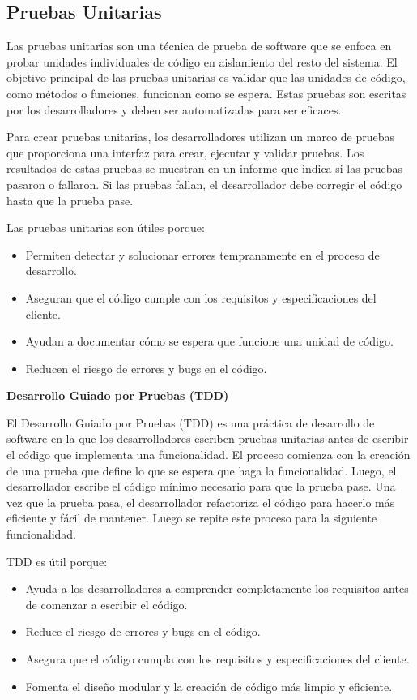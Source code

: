 \documentclass[executivepaper]{article}
\begin{document}
\subsection{Pruebas Unitarias}

Las pruebas unitarias son una técnica de prueba de software que se enfoca en probar unidades individuales de código en aislamiento del resto del sistema. El objetivo principal de las pruebas unitarias es validar que las unidades de código, como métodos o funciones, funcionan como se espera. Estas pruebas son escritas por los desarrolladores y deben ser automatizadas para ser eficaces.

Para crear pruebas unitarias, los desarrolladores utilizan un marco de pruebas que proporciona una interfaz para crear, ejecutar y validar pruebas. Los resultados de estas pruebas se muestran en un informe que indica si las pruebas pasaron o fallaron. Si las pruebas fallan, el desarrollador debe corregir el código hasta que la prueba pase.

Las pruebas unitarias son útiles porque:

\begin{itemize}
\item Permiten detectar y solucionar errores tempranamente en el proceso de desarrollo.
\item Aseguran que el código cumple con los requisitos y especificaciones del cliente.
\item Ayudan a documentar cómo se espera que funcione una unidad de código.
\item Reducen el riesgo de errores y bugs en el código.
\end{itemize}

\textbf{Desarrollo Guiado por Pruebas (TDD)}

El Desarrollo Guiado por Pruebas (TDD) es una práctica de desarrollo de software en la que los desarrolladores escriben pruebas unitarias antes de escribir el código que implementa una funcionalidad. El proceso comienza con la creación de una prueba que define lo que se espera que haga la funcionalidad. Luego, el desarrollador escribe el código mínimo necesario para que la prueba pase. Una vez que la prueba pasa, el desarrollador refactoriza el código para hacerlo más eficiente y fácil de mantener. Luego se repite este proceso para la siguiente funcionalidad.

TDD es útil porque:

\begin{itemize}
\item Ayuda a los desarrolladores a comprender completamente los requisitos antes de comenzar a escribir el código.
\item Reduce el riesgo de errores y bugs en el código.
\item Asegura que el código cumpla con los requisitos y especificaciones del cliente.
\item Fomenta el diseño modular y la creación de código más limpio y eficiente.
\end{itemize}
\end{document}
